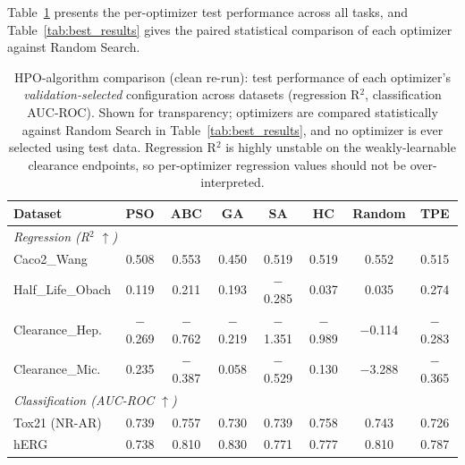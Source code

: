\documentclass[journal]{IEEEtran}
\begin{document}
Table~\ref{tab:hpo_results} presents the per-optimizer test performance across all tasks, and Table~\ref{tab:best_results} gives the paired statistical comparison of each optimizer against Random Search.

\begin{table}[!t]
\centering
\caption{HPO-algorithm comparison (clean re-run): test performance of each optimizer's \emph{validation-selected} configuration across datasets (regression R$^2$, classification AUC-ROC). Shown for transparency; optimizers are compared statistically against Random Search in Table~\ref{tab:best_results}, and no optimizer is ever selected using test data. Regression R$^2$ is highly unstable on the weakly-learnable clearance endpoints, so per-optimizer regression values should not be over-interpreted.}
\label{tab:hpo_results}
\scriptsize
\begin{tabular}{lccccccc}
\toprule
\textbf{Dataset} & \textbf{PSO} & \textbf{ABC} & \textbf{GA} & \textbf{SA} & \textbf{HC} & \textbf{Random} & \textbf{TPE} \\
\midrule
\multicolumn{8}{l}{\emph{Regression (R$^2$ $\uparrow$)}} \\
\midrule
Caco2\_Wang & 0.508 & 0.553 & 0.450 & 0.519 & 0.519 & 0.552 & 0.515 \\
Half\_Life\_Obach & 0.119 & 0.211 & 0.193 & $-$0.285 & 0.037 & 0.035 & 0.274 \\
Clearance\_Hep. & $-$0.269 & $-$0.762 & $-$0.219 & $-$1.351 & $-$0.989 & $-$0.114 & $-$0.283 \\
Clearance\_Mic. & 0.235 & $-$0.387 & 0.058 & $-$0.529 & 0.130 & $-$3.288 & $-$0.365 \\
\midrule
\multicolumn{8}{l}{\emph{Classification (AUC-ROC $\uparrow$)}} \\
\midrule
Tox21 (NR-AR) & 0.739 & 0.757 & 0.730 & 0.739 & 0.758 & 0.743 & 0.726 \\
hERG & 0.738 & 0.810 & 0.830 & 0.771 & 0.777 & 0.810 & 0.787 \\
\bottomrule
\end{tabular}
\end{table}
\end{document}
